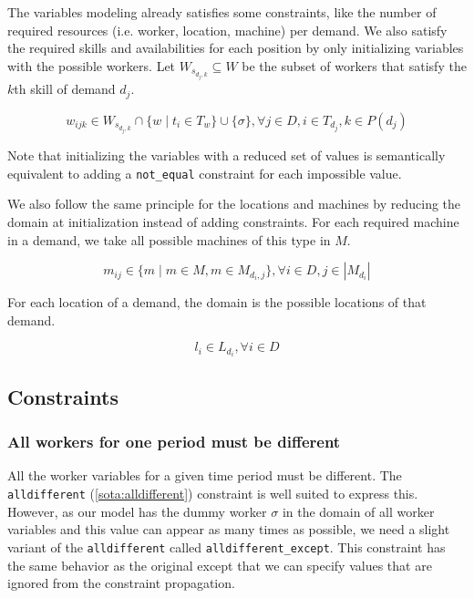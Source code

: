 \documentclass[../../thesis.tex]{subfiles}
\begin{document}
The variables modeling already satisfies some constraints, like the number of required resources (i.e. worker, location, machine)
per demand. We also satisfy the required skills and availabilities for each position by only initializing variables with the 
possible workers. Let $W_{s_{d_j,k}} \subseteq W$ be the subset of workers that satisfy the $k$th skill of demand $d_j$.

\begin{equation}
  \label{wdomain}
  w_{ijk} \in W_{s_{d_j,k}} \cap \{ w \mid t_i \in T_w \} \cup \{ \sigma \}, \forall j \in D, i \in T_{d_j}, k \in P(d_j)
\end{equation}

Note that initializing the variables with a reduced set of values is semantically equivalent to adding a \texttt{not\_equal} constraint for each impossible value.


We also follow the same principle for the locations and machines by reducing the domain at initialization instead of adding constraints.
For each required machine in a demand, we take all possible machines of this type in $M$.

\begin{equation}
  \label{mdomain}
  m_{ij} \in \{ m \mid m \in M, m \in M_{{d_i},j}  \}, \forall i \in D, j \in |M_{d_i}|
\end{equation}

For each location of a demand, the domain is the possible locations of that demand.

\begin{equation}
  \label{ldomain}
  l_i \in L_{d_i}, \forall i \in D
\end{equation}


\subsection{Constraints}

\subsubsection{All workers for one period must be different}

All the worker variables for a given time period must be different. 
The \texttt{alldifferent} (\autoref{sota:alldifferent}) constraint is well suited to express this. 
However, as our model has the dummy worker $\sigma$ in the domain of all worker variables and this value 
can appear as many times as possible, we need a slight variant of the \texttt{alldifferent} called \texttt{alldifferent\_except}. 
This constraint has the same behavior as the original except that we can specify values that are ignored from 
the constraint propagation.
\end{document}
